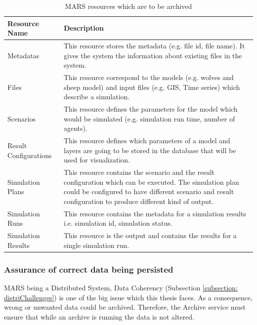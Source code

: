         \begin{table}[H]
            \centering
            \begin{tabular}{|p{3cm}|p{12cm}|}
                \hline
                    \textbf{Resource Name}  & \textbf{Description}\\
                \hline
                     Metadatas & 
                     This resource stores the metadata (e.g. file id, file name). It gives the system the information about
                     existing files in the system. \\
                \hline
                     Files & 
                     This resource correspond to the models (e.g. wolves and sheep model) and input files (e.g. GIS, Time series) which describe a simulation. \\
                \hline
                     Scenarios & 
                     This resource defines the parameters for the model which would be simulated (e.g. simulation run time, number of agents). \\
                \hline
                     Result Configurations & 
                     This resource defines which parameters of a model and layers are going to be stored in the database that will be used for visualization.\\
                \hline
                     Simulation Plans & 
                     This resource contains the scenario and the result configuration which can be executed. The simulation plan could be configured to
                     have different scenario and result configuration to produce different kind of output.\\
                \hline
                     Simulation Runs & 
                     This resource contains the metadata for a simulation results i.e. simulation id, simulation status.\\
                \hline
                     Simulation Results & 
                     This resource is the output and contains the results for a single simulation run.\\
                \hline
            \end{tabular}
            \caption{MARS resources which are to be archived}
            \label{table: archivedMars}     
        \end{table} 
        
        \subsubsection{Assurance of correct data being persisted}
            MARS being a Distributed System, Data Coherency (Subsection \ref{subsection: distriChallenges}) 
            is one of the big issue which this thesis faces. As a consequence,
            wrong or unwanted data could be archived. Therefore, the Archive service must ensure that while an archive is running the data is not
            altered.
        
